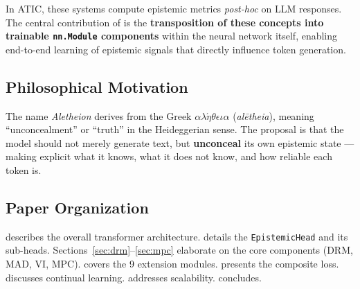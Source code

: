 In ATIC, these systems compute epistemic metrics \textit{post-hoc} on LLM
responses. The central contribution of \aletheion{} is the
\textbf{transposition of these concepts into trainable \texttt{nn.Module}
components} within the neural network itself, enabling end-to-end learning
of epistemic signals that directly influence token generation.

\subsection{Philosophical Motivation}

The name \textit{Aletheion} derives from the Greek
$\alpha\lambda\acute{\eta}\theta\epsilon\iota\alpha$ (\textit{al\=etheia}),
meaning ``unconcealment'' or ``truth'' in the Heideggerian sense. The
proposal is that the model should not merely generate text, but
\textbf{unconceal} its own epistemic state --- making explicit what it
knows, what it does not know, and how reliable each token is.

\subsection{Paper Organization}

 describes the overall transformer architecture.
 details the \texttt{EpistemicHead} and its sub-heads.
Sections~\ref{sec:drm}--\ref{sec:mpc} elaborate on the core components
(DRM, MAD, VI, MPC).  covers the 9 extension modules.
 presents the composite loss.  discusses
continual learning.  addresses scalability.
 concludes.
